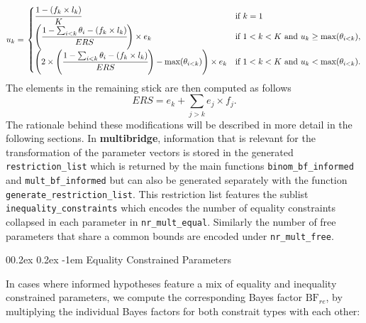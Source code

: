 \documentclass[
  english,
  man,floatsintext]{apa6}
\makeatletter
\let\oldparagraph\paragraph
\renewcommand{\paragraph}[1]{\oldparagraph{#1}\mbox{}}
\renewcommand{\paragraph}{\@startsection{paragraph}{4}{\parindent}%
  {0\baselineskip \@plus 0.2ex \@minus 0.2ex}%
  {-1em}%
  {\normalfont\normalsize\bfseries\itshape\typesectitle}}
\makeatother
\begin{document}
\begin{appendix}
\begin{align}
u_k = \left.
\begin{cases}
\cfrac{1 - (f_k \times l_k)}{K} & \text{if } k = 1 \\
\left( \cfrac{1 - \sum_{i < k} \theta_i - (f_k \times l_k)}{ERS} \right) \times e_k & \text{if } 1 < k < K \text{ and } u_k \geq \text{max}(\theta_{i < k}), \\
\left( 2 \times \left( \cfrac{1 - \sum_{i < k} \theta_i - (f_k \times l_k)}{ERS} \right) - \text{max}(\theta_{i < k}) \right)  \times e_k & \text{if } 1 < k < K \text{ and } u_k < \text{max}(\theta_{i < k}).
\end{cases}
\right.
\end{align} The elements in the remaining stick are then computed as
follows \[ERS = e_k + \sum_{j > k} e_j \times f_j.\] The rationale
behind these modifications will be described in more detail in the
following sections. In \textbf{multibridge}, information that is
relevant for the transformation of the parameter vectors is stored in
the generated \texttt{restriction\_list} which is returned by the main
functions \texttt{binom\_bf\_informed} and \texttt{mult\_bf\_informed}
but can also be generated separately with the function
\texttt{generate\_restriction\_list}. This restriction list features the
sublist \texttt{inequality\_constraints} which encodes the number of
equality constraints collapsed in each parameter in
\texttt{nr\_mult\_equal}. Similarly the number of free parameters that
share a common bounds are encoded under \texttt{nr\_mult\_free}.

\hypertarget{equality-constrained-parameters}{%
\paragraph{Equality Constrained
Parameters}\label{equality-constrained-parameters}}

In cases where informed hypotheses feature a mix of equality and
inequality constrained parameters, we compute the corresponding Bayes
factor \(\text{BF}_{re}\), by multiplying the individual Bayes factors
for both constrait types with each other:


\end{appendix}
\end{document}
